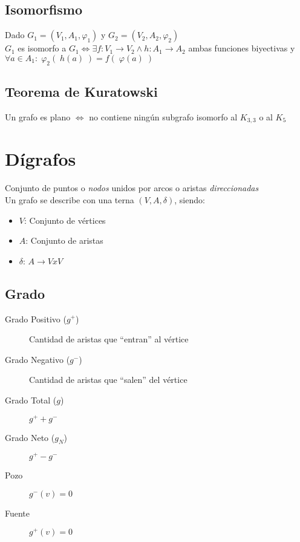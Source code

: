\documentclass[a4paper]{article}
\numberwithin{equation}{section}
\numberwithin{figure}{section}
\numberwithin{table}{section}
\newcommand{\refa}[1]{}
\begin{document}
\subsection{Isomorfismo}\label{isomorfo}
Dado $G_1 = (V_1, A_1, \varphi_1)$ y $G_2 = (V_2, A_2, \varphi_2)$ \\
$G_1$ es isomorfo a $G_1 \iff \exists f:V_1 \to V_2 \land h: A_1 \to A_2$ ambas funciones biyectivas y $\forall a \in A_1 :\; \varphi_2( \;h(a) \;) = f(\; \varphi(a) \;)$

\subsection{Teorema de Kuratowski}
Un grafo es plano $\iff$ no contiene ning\'un subgrafo\refa{subgrafo} isomorfo\refa{isomorfo} al $K_{3,3}$ o al $K_5$


\section{D\'igrafos}
Conjunto de puntos o \emph{nodos} unidos por arcos o aristas \emph{direccionadas}\\
Un grafo se describe con una terna $(V,A,\delta )$, siendo:

\begin{itemize}
	\item $V$: Conjunto de v\'ertices
    \item $A$: Conjunto de aristas
    \item $\delta $: $A \to VxV$
\end{itemize}

\subsection{Grado}
\begin{description}
	\item[Grado Positivo ($g^+$)] Cantidad de aristas que ``entran'' al v\'ertice
    \item[Grado Negativo ($g^-$)] Cantidad de aristas que ``salen'' del v\'ertice
    \item[Grado Total ($g$)] $g^+ + g^-$
    \item[Grado Neto ($g_N$)] $g^+ - g^-$
    \item[Pozo] $g^-(v) = 0$
    \item[Fuente] $g^+(v) = 0$
\end{description}
\end{document}
